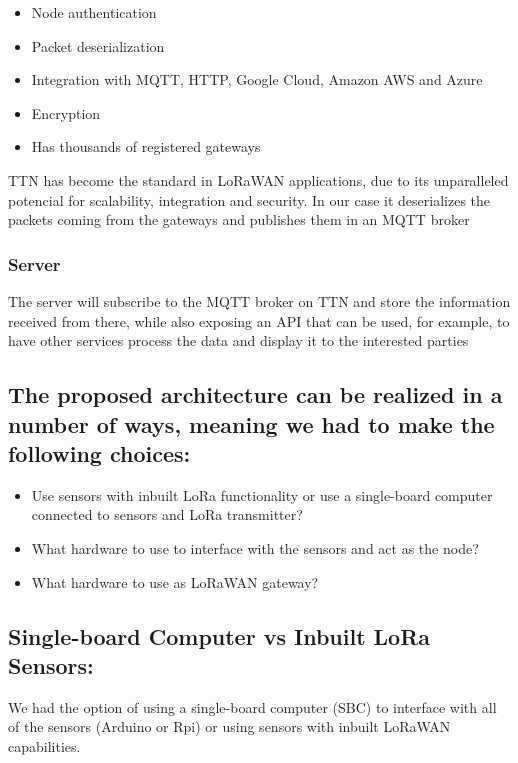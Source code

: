 \begin{itemize}
	\item Node authentication
	\item Packet deserialization
	\item Integration with MQTT, HTTP, Google Cloud, Amazon AWS and Azure
	\item Encryption
	\item Has thousands of registered gateways
\end{itemize}

TTN has become the standard in LoRaWAN applications, due to its unparalleled potencial for scalability, integration and security. In our case it deserializes the packets coming from the gateways and publishes them in an MQTT broker 

\subsubsection{Server}
The server will subscribe to the MQTT broker on TTN and store the information received from there, while also exposing an API that can be used, for example, to have other services process the data and display it to the interested parties


\subsection{The proposed architecture can be realized in a number of ways, meaning we had to make the following choices:}
\begin{itemize}
	\item Use sensors with inbuilt LoRa functionality or use a single-board computer connected to sensors and LoRa transmitter?
	\item What hardware to use to interface with the sensors and act as the node?
	\item What hardware to use as LoRaWAN gateway?
\end{itemize}

\subsection{Single-board Computer vs Inbuilt LoRa Sensors:}

We had the option of using a single-board computer (SBC) to interface with all of the sensors (Arduino or Rpi) or using sensors with inbuilt LoRaWAN capabilities.

